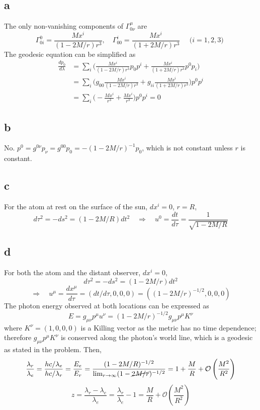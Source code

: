 \documentclass{article}
\begin{document}
\section{}
\subsection*{a}
The only non-vanishing components of $\Gamma^{\mu}_{0\nu}$ are
\[ \Gamma^{0}_{0i} = \frac{Mx^i}{(1-2M/r)r^3}, \quad \Gamma^{i}_{00} = \frac{Mx^i}{(1+2M/r)r^3} \quad\text{  ($i = 1,2,3$) }\]
The geodesic equation can be simplified as
\begin{align*}
\frac{dp_0}{d\lambda} &= \sum_i \Bigg( \frac{Mx^i}{(1-2M/r)r^3}p_0 p^i + \frac{Mx^i}{(1+2M/r)r^3}p^0 p_i \Bigg)\\
&= \sum_i \Bigg( g_{00}\frac{Mx^i}{(1-2M/r)r^3} + g_{ii}\frac{Mx^i}{(1+2M/r)r^3} \Bigg)p^0 p^i\\
&= \sum_i \Bigg( -\frac{Mx^i}{r^3} + \frac{Mx^i}{r^3} \Bigg)p^0 p^i = 0
\end{align*}
\subsection*{b}
No. $p^0 = g^{0\nu}p_\nu = g^{00}p_0 = -(1-2M/r)^{-1}p_0$, which is not constant unless $r$ is constant.
\subsection*{c}
For the atom at rest on the surface of the sun, $dx^i = 0$, $r = R$,
\[ d\tau^2 = -ds^2 = (1-2M/R)dt^2 \quad\Rightarrow\quad u^0 = \frac{dt}{d\tau} = \frac{1}{\sqrt{1-2M/R}} \]
\subsection*{d}
For both the atom and the distant observer, $dx^i = 0$,
\[ d\tau^2  = -ds^2 = (1-2M/r)dt^2 \]
\[ \Rightarrow\quad u^\mu = \frac{dx^\mu}{d\tau} = (dt/d\tau,0,0,0)  = ((1-2M/r)^{-1/2}, 0, 0,0) \]
The photon energy observed at both locations can be expressed as
\[ E = g_{\mu\nu}p^\mu u^\nu = (1-2M/r)^{-1/2} g_{\mu\nu}p^\mu K^\nu \]
where $K^\nu = (1,0,0,0)$ is a Killing vector as the metric has no time dependence; therefore $g_{\mu\nu}p^\mu K^\nu$ is conserved along the photon's world line, which is a geodesic as stated in the problem. Then,
\[ \frac{\lambda_r}{\lambda_e} = \frac{h c /\lambda_e}{h c/\lambda_r} = \frac{E_e}{E_r} = \frac{(1-2M/R)^{-1/2}}{\lim_{r\rightarrow\infty} (1-\cancel{2M/r})^{-1/2}} = 1 + \frac{M}{R} + \mathcal{O}\left(\frac{M^2}{R^2}\right)\]
\[ z = \frac{\lambda_r - \lambda_e}{\lambda_e} = \frac{\lambda_r}{\lambda_e} - 1 = \frac{M}{R} + \mathcal{O}\left(\frac{M^2}{R^2}\right) \]
\end{document}
